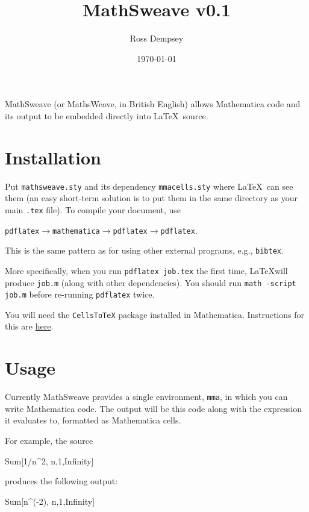 \documentclass{article}
\title{MathSweave v0.1}
\author{Ross Dempsey}
\date{\today}
\begin{document}
\maketitle

MathSweave (or MathsWeave, in British English) allows Mathematica code and its output to be embedded directly into \LaTeX\ source.

\section{Installation}

Put \texttt{mathsweave.sty} and its dependency \texttt{mmacells.sty} where \LaTeX\ can see them (an easy short-term solution is to put them in the same directory as your main \texttt{.tex} file). To compile your document, use
\begin{center}
    \texttt{pdflatex}$\to$\texttt{mathematica}$\to$\texttt{pdflatex}$\to$\texttt{pdflatex}.
\end{center}
This is the same pattern as for using other external programs, e.g., \texttt{bibtex}.

More specifically, when you run \texttt{pdflatex job.tex} the first time, \LaTeX will produce \texttt{job.m} (along with other dependencies). You should run \texttt{math -script job.m} before re-running \texttt{pdflatex} twice.

You will need the \texttt{CellsToTeX} package installed in Mathematica. Instructions for this are \href{https://github.com/jkuczm/MathematicaCellsToTeX}{here}.

\section{Usage}

Currently MathSweave provides a single environment, \texttt{mma}, in which you can write Mathematica code. The output will be this code along with the expression it evaluates to, formatted as Mathematica cells.

For example, the source
\begin{texsource}
    \begin{mma}
        Sum[1/n^2, {n,1,Infinity}]
    \end{mma}
\end{texsource}
produces the following output:

\begin{mma}
    Sum[n^(-2), {n,1,Infinity}]
\end{mma}
\end{document}
